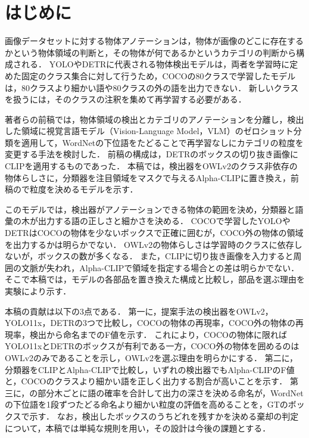 \section{はじめに}
画像データセットに対する物体アノテーションは，物体が画像のどこに存在するかという物体領域の判断と，その物体が何であるかというカテゴリの判断から構成される．
YOLO\cite{ref_YOLO}やDETR\cite{ref_DETR}に代表される物体検出モデルは，両者を学習時に定めた固定のクラス集合に対して行うため，COCO\cite{ref_COCO}の80クラスで学習したモデルは，80クラスより細かい語や80クラスの外の語を出力できない．
新しいクラスを扱うには，そのクラスの注釈を集めて再学習する必要がある．

著者らの前稿\cite{ref_prev,ref_prevVG}では，物体領域の検出とカテゴリのアノテーションを分離し，検出した領域に視覚言語モデル（Vision-Language Model，VLM）のゼロショット分類を適用して，WordNet\cite{ref_WordNet}の下位語をたどることで再学習なしにカテゴリの粒度を変更する手法を検討した．
前稿の構成は，DETRのボックスの切り抜き画像にCLIP\cite{ref_CLIP}を適用するものであった．
本稿では，検出器をOWLv2\cite{ref_OWLv2}のクラス非依存の物体らしさに，分類器を注目領域をマスクで与えるAlpha-CLIP\cite{ref_AlphaCLIP}に置き換え，前稿\cite{ref_prevVG}ので粒度を決めるモデルを示す．

このモデルでは，検出器がアノテーションできる物体の範囲を決め，分類器と語彙の木が出力する語の正しさと細かさを決める．
COCOで学習したYOLOやDETRはCOCOの物体を少ないボックスで正確に囲むが，COCO外の物体の領域を出力するかは明らかでない．
OWLv2の物体らしさは学習時のクラスに依存しないが，ボックスの数が多くなる．
また，CLIPに切り抜き画像を入力すると周囲の文脈が失われ，Alpha-CLIPで領域を指定する場合との差は明らかでない．
そこで本稿では，モデルの各部品を置き換えた構成と比較し，部品を選ぶ理由を実験により示す．

本稿の貢献は以下の3点である．
第一に，提案手法の検出器をOWLv2，YOLO11x，DETRの3つで比較し，COCOの物体の再現率，COCO外の物体の再現率，検出から命名までのF値を示す．
これにより，COCOの物体に限ればYOLO11xとDETRのボックスが有利である一方，COCO外の物体を囲めるのはOWLv2のみであることを示し，OWLv2を選ぶ理由を明らかにする．
第二に，分類器をCLIPとAlpha-CLIPで比較し，いずれの検出器でもAlpha-CLIPのF値と，COCOのクラスより細かい語を正しく出力する割合が高いことを示す．
第三に，の部分木ごとに語の確率を合計して出力の深さを決める命名が，WordNetの下位語を1段ずつたどる命名より細かい粒度の評価を高めることを，GTのボックスで示す．
なお，検出したボックスのうちどれを残すかを決める棄却の判定について，本稿では単純な規則を用い，その設計は今後の課題とする．
